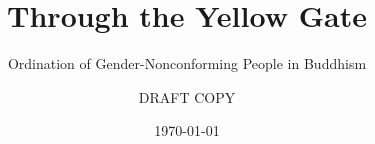 \clearpage
\thispagestyle{empty}
\titlehead{}
\title{Through the Yellow Gate}
\subtitle{Ordination of Gender-Nonconforming People in Buddhism}
\author{DRAFT COPY}
\date{\today}
\maketitle
